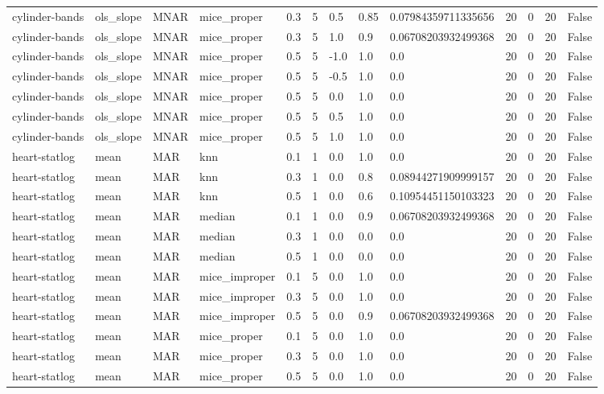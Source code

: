 \begin{tabular}{lllllllllllll}
cylinder-bands & ols\_slope & MNAR & mice\_proper & 0.3 & 5 & 0.5 & 0.85 & 0.07984359711335656 & 20 & 0 & 20 & False \\
cylinder-bands & ols\_slope & MNAR & mice\_proper & 0.3 & 5 & 1.0 & 0.9 & 0.06708203932499368 & 20 & 0 & 20 & False \\
cylinder-bands & ols\_slope & MNAR & mice\_proper & 0.5 & 5 & -1.0 & 1.0 & 0.0 & 20 & 0 & 20 & False \\
cylinder-bands & ols\_slope & MNAR & mice\_proper & 0.5 & 5 & -0.5 & 1.0 & 0.0 & 20 & 0 & 20 & False \\
cylinder-bands & ols\_slope & MNAR & mice\_proper & 0.5 & 5 & 0.0 & 1.0 & 0.0 & 20 & 0 & 20 & False \\
cylinder-bands & ols\_slope & MNAR & mice\_proper & 0.5 & 5 & 0.5 & 1.0 & 0.0 & 20 & 0 & 20 & False \\
cylinder-bands & ols\_slope & MNAR & mice\_proper & 0.5 & 5 & 1.0 & 1.0 & 0.0 & 20 & 0 & 20 & False \\
heart-statlog & mean & MAR & knn & 0.1 & 1 & 0.0 & 1.0 & 0.0 & 20 & 0 & 20 & False \\
heart-statlog & mean & MAR & knn & 0.3 & 1 & 0.0 & 0.8 & 0.08944271909999157 & 20 & 0 & 20 & False \\
heart-statlog & mean & MAR & knn & 0.5 & 1 & 0.0 & 0.6 & 0.10954451150103323 & 20 & 0 & 20 & False \\
heart-statlog & mean & MAR & median & 0.1 & 1 & 0.0 & 0.9 & 0.06708203932499368 & 20 & 0 & 20 & False \\
heart-statlog & mean & MAR & median & 0.3 & 1 & 0.0 & 0.0 & 0.0 & 20 & 0 & 20 & False \\
heart-statlog & mean & MAR & median & 0.5 & 1 & 0.0 & 0.0 & 0.0 & 20 & 0 & 20 & False \\
heart-statlog & mean & MAR & mice\_improper & 0.1 & 5 & 0.0 & 1.0 & 0.0 & 20 & 0 & 20 & False \\
heart-statlog & mean & MAR & mice\_improper & 0.3 & 5 & 0.0 & 1.0 & 0.0 & 20 & 0 & 20 & False \\
heart-statlog & mean & MAR & mice\_improper & 0.5 & 5 & 0.0 & 0.9 & 0.06708203932499368 & 20 & 0 & 20 & False \\
heart-statlog & mean & MAR & mice\_proper & 0.1 & 5 & 0.0 & 1.0 & 0.0 & 20 & 0 & 20 & False \\
heart-statlog & mean & MAR & mice\_proper & 0.3 & 5 & 0.0 & 1.0 & 0.0 & 20 & 0 & 20 & False \\
heart-statlog & mean & MAR & mice\_proper & 0.5 & 5 & 0.0 & 1.0 & 0.0 & 20 & 0 & 20 & False \\

\end{tabular}

